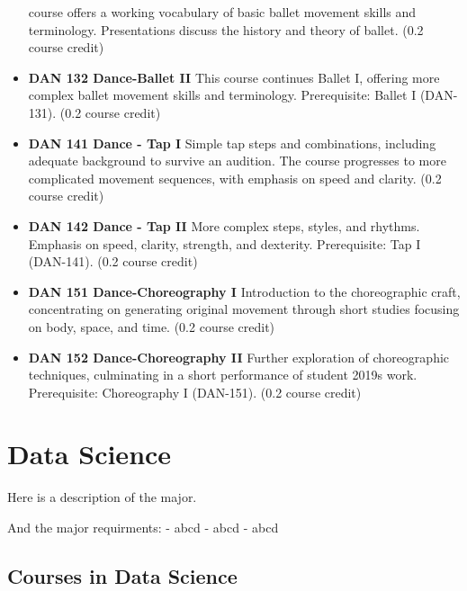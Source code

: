 \documentclass[
  letterpaper,
]{scrbook}
\begin{document}
\begin{itemize}
  course offers a working vocabulary of basic ballet movement skills and
  terminology. Presentations discuss the history and theory of ballet.
  (0.2 course credit)
\item
  \textbf{DAN 132 Dance-Ballet II} This course continues Ballet I,
  offering more complex ballet movement skills and terminology.
  Prerequisite: Ballet I (DAN-131). (0.2 course credit)
\item
  \textbf{DAN 141 Dance - Tap I} Simple tap steps and combinations,
  including adequate background to survive an audition. The course
  progresses to more complicated movement sequences, with emphasis on
  speed and clarity. (0.2 course credit)
\item
  \textbf{DAN 142 Dance - Tap II} More complex steps, styles, and
  rhythms. Emphasis on speed, clarity, strength, and dexterity.
  Prerequisite: Tap I (DAN-141). (0.2 course credit)
\item
  \textbf{DAN 151 Dance-Choreography I} Introduction to the
  choreographic craft, concentrating on generating original movement
  through short studies focusing on body, space, and time. (0.2 course
  credit)
\item
  \textbf{DAN 152 Dance-Choreography II} Further exploration of
  choreographic techniques, culminating in a short performance of
  student 2019s work. Prerequisite: Choreography I (DAN-151). (0.2
  course credit)
\end{itemize}

\hypertarget{data-science}{%
\section{Data Science}\label{data-science}}

Here is a description of the major.

And the major requirments: - abcd - abcd - abcd

\hypertarget{courses-in-data-science}{%
\subsection{Courses in Data Science}\label{courses-in-data-science}}
\end{document}
